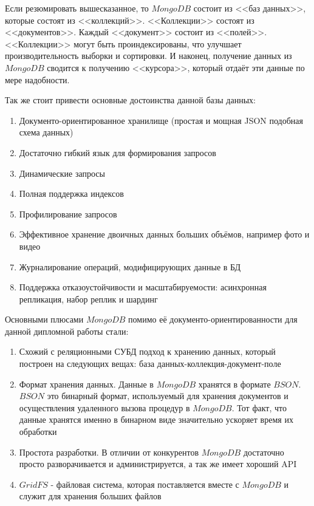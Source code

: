 \documentclass[14pt]{extreport}
\begin{document}
Если резюмировать вышесказанное, то $MongoDB$ состоит из <<баз данных>>, которые состоят из <<коллекций>>. <<Коллекции>> состоят из <<документов>>. Каждый <<документ>> состоит из <<полей>>. <<Коллекции>> могут быть проиндексированы, что улучшает производительность выборки и сортировки. И наконец, получение данных из $MongoDB$ сводится к получению <<курсора>>, который отдаёт эти данные по мере надобности.

Так же стоит привести основные достоинства данной базы данных:

\begin{enumerate}

\item Документо-ориентированное хранилище (простая и мощная JSON подобная схема данных)
\item Достаточно гибкий язык для формирования запросов
\item Динамические запросы
\item Полная поддержка индексов
\item Профилирование запросов
\item Эффективное хранение двоичных данных больших объёмов, например фото и видео
\item Журналирование операций, модифицирующих данные в БД
\item Поддержка отказоустойчивости и масштабируемости: асинхронная репликация, набор реплик и шардинг

\end{enumerate}

Основными плюсами $MongoDB$ помимо её документо-ориентированности для данной дипломной работы стали:

\begin{enumerate}

\item Схожий с реляционными СУБД подход к хранению данных, который построен на следующих вещах: база данных-коллекция-документ-поле

\item Формат хранения данных. Данные в $MongoDB$ хранятся в формате $BSON$. $BSON$ это бинарный формат, используемый для хранения документов и осуществления удаленного вызова процедур в $MongoDB$. Тот факт, что данные хранятся именно в бинарном виде значительно ускоряет время их обработки

\item Простота разработки. В отличии от конкурентов $MongoDB$ достаточно просто разворачивается и администрируется, а так же имеет хороший API 

\item $GridFS$ - файловая система, которая поставляется вместе с $MongoDB$ и служит для хранения больших файлов

\end{enumerate}
\end{document}
